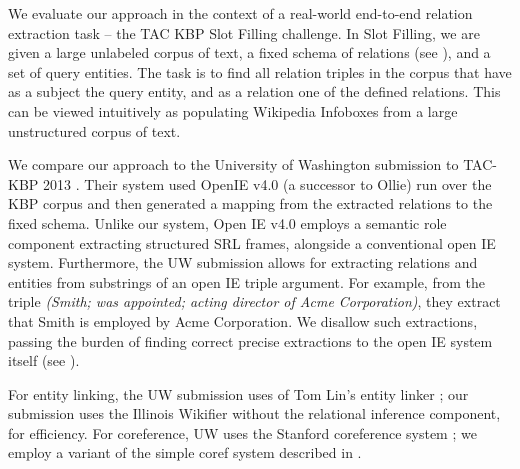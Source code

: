 We evaluate our approach in the context of a real-world end-to-end 
  relation extraction task -- the TAC KBP Slot Filling challenge.
In Slot Filling, we are given a large unlabeled corpus of text, a fixed
  schema of relations (see ), and a set of
  query entities.
The task is to find all relation triples in the corpus that have as a subject
  the query entity, and as a relation one of the defined relations.
This can be viewed intuitively as populating Wikipedia Infoboxes from a large
  unstructured corpus of text.

We compare our approach to the University of Washington submission to
  TAC-KBP 2013 \cite{key:2013soderland-kbp}.
Their system used OpenIE v4.0 (a successor to Ollie) 
  run over the KBP corpus and then generated a mapping from the 
  extracted relations to the fixed schema.
Unlike our system, Open IE v4.0 employs a semantic role
  component extracting structured SRL frames, alongside a conventional
  open IE system.
Furthermore, the UW submission allows for extracting relations and entities
  from substrings of an open IE triple argument.
For example, from the triple \textit{(Smith; was appointed; acting director of Acme
  Corporation)}, they extract that Smith is employed by Acme Corporation.
We disallow such extractions, passing the burden of finding correct
  precise extractions to the open IE system itself (see ).

For entity linking, the UW submission uses of Tom Lin's entity linker
  \cite{key:2012lin-el}; our submission uses the Illinois Wikifier 
  \cite{key:2011ratinov-el} without the relational inference component, for
  efficiency.
For coreference, UW uses the Stanford coreference system
  \cite{key:stanford-coref}; we employ a variant of the simple coref system
  described in \cite{key:2014pink-kbp}.

